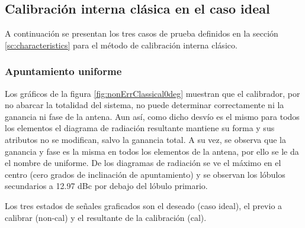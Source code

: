 \subsection{Calibración interna clásica en el caso ideal}

A continuación se presentan los tres casos de prueba definidos en la sección \ref{sc:characteristics} para el método de
calibración interna clásico.

\subsubsection{Apuntamiento uniforme}

Los gráficos de la figura \ref{fig:nonErrClassical0deg} muestran que el calibrador, por no abarcar la totalidad del sistema, no 
puede determinar correctamente ni la ganancia ni fase de la antena. Aun así, como dicho desvío es el mismo para todos los
elementos el diagrama de radiación resultante mantiene su forma y sus atributos no se modifican, salvo la ganancia total. A su
vez, se observa que la ganancia y fase es la misma en todos los elementos de la antena, por ello se le da el nombre de uniforme.
De los diagramas de radiación se ve el máximo en el centro (cero grados de inclinación de apuntamiento) y se observan los
lóbulos secundarios a 12.97 dBc por debajo del lóbulo primario.

Los tres estados de señales graficados son el deseado (caso ideal), el previo a calibrar (non-cal) y el resultante de la
calibración (cal).

